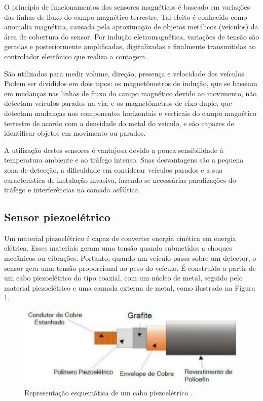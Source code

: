 O princípio de funcionamentos dos sensores magnéticos é baseado em variações das linhas de fluxo do campo magnético terrestre. Tal efeito é conhecido como anomalia magnética, causada pela aproximação de objetos metálicos (veículos) da área de cobertura do sensor. Por indução eletromagnética, variações de tensão são geradas e posteriormente amplificadas, digitalizadas e finalmente transmitidas ao controlador eletrônico que realiza a contagem.

São utilizados para medir volume, direção, presença e velocidade dos veículos. Podem ser divididos em dois tipos: os magnetômetros de indução, que se baseiam em mudanças nas linhas de fluxo do campo magnético devido ao movimento, não detectam veículos parados na via; e os magnetômetros de eixo duplo, que detectam mudanças nos componentes horizontais e verticais do campo magnético terrestre de acordo com a densidade do metal do veículo, e são capazes de identificar objetos em movimento ou parados.

 A utilização destes sensores é vantajosa devido a pouca sensibilidade à temperatura ambiente e ao tráfego intenso. Suas desvantagens são a pequena zona de detecção, a dificuldade em considerar veículos parados e a sua característica de instalação invasiva, fazendo-se necessárias paralizações do tráfego e interferências na camada asfáltica.


\subsection{Sensor piezoelétrico} %
\label{sub:sensores_piezoel_tricos}

Um material piezoelétrico é capaz de converter energia cinética em energia elétrica. Esses materiais geram uma tensão quando submetidos a choques mecânicos ou vibrações. Portanto, quando um veículo passa sobre um detector, o sensor gera uma tensão proporcional ao peso do veículo. É construído a partir de um cabo piezoelétrico do tipo coaxial, com um núcleo de metal, seguido pelo material piezoelétrico e uma camada externa de metal, como ilustrado na Figura \ref{fig:piezoeletrico}.

\begin{figure}[ht]
  \begin{center}
    \includegraphics[scale=0.6]{imgs/piezoeletrico.png}
  \end{center}
  \caption{Representação esquemática de um cabo piezoelétrico \citep{goldner:2009:misc}.}
  \label{fig:piezoeletrico}
\end{figure}

